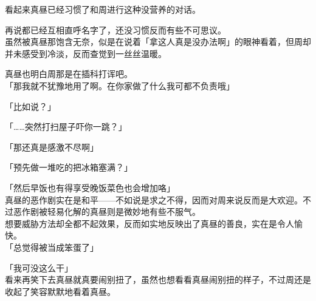 看起来真昼已经习惯了和周进行这种没营养的对话。

再说都已经互相直呼名字了，还没习惯反而有些不可思议。\\

虽然被真昼那饱含无奈，似是在说着「拿这人真是没办法啊」的眼神看着，但周却并未感受到冷淡，反而查觉到一丝丝温暖。

真昼也明白周那是在插科打诨吧。\\

「那我就不犹豫地用了啊。在你家做了什么我可都不负责哦」

「比如说？」

「……突然打扫屋子吓你一跳？」

「那还真是感激不尽啊」

「预先做一堆吃的把冰箱塞满？」

「然后早饭也有得享受晚饭菜色也会增加咯」\\

真昼的恶作剧实在是和平——不如说是求之不得，因而对周来说反而是大欢迎。不过恶作剧被轻易化解的真昼则是微妙地有些不服气。\\

想要威胁方法却全都不起效果，反而如实地反映出了真昼的善良，实在是令人愉快。\\

「总觉得被当成笨蛋了」

「我可没这么干」\\

看来再笑下去真昼就真要闹别扭了，虽然也想看看真昼闹别扭的样子，不过周还是收起了笑容默默地看着真昼。\\